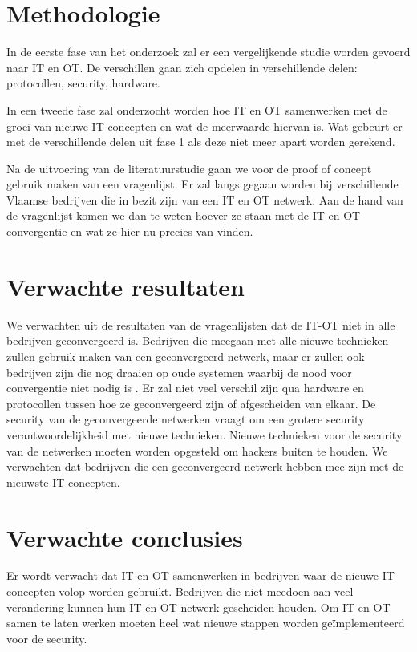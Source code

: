 \section{Methodologie}
\label{sec:methodologie}

In de eerste fase van het onderzoek zal er een vergelijkende studie worden gevoerd naar IT en OT. De verschillen gaan zich opdelen in verschillende delen: protocollen, security, hardware. 


In een tweede fase zal onderzocht worden hoe IT en OT samenwerken met de groei van nieuwe IT concepten en wat de meerwaarde hiervan is. Wat gebeurt er met de verschillende delen uit fase 1 als deze niet meer apart worden gerekend. 


Na de uitvoering van de literatuurstudie gaan we voor de proof of concept gebruik maken van een vragenlijst. Er zal langs gegaan worden bij verschillende Vlaamse bedrijven die in bezit zijn van een IT en OT netwerk. Aan de hand van de vragenlijst komen we dan te weten hoever ze staan met de IT en OT convergentie en wat ze hier nu precies van vinden. 




\section{Verwachte resultaten}
\label{sec:verwachte_resultaten}

We verwachten uit de resultaten van de vragenlijsten dat de IT-OT niet in alle bedrijven geconvergeerd is. Bedrijven die meegaan met alle nieuwe technieken zullen gebruik maken van een geconvergeerd netwerk, maar er zullen ook bedrijven zijn die nog draaien op oude systemen waarbij de nood voor convergentie niet nodig is \autocite{Berge2018}. Er zal niet veel verschil zijn qua hardware en protocollen tussen hoe ze geconvergeerd zijn of afgescheiden van elkaar. De security van de geconvergeerde netwerken vraagt om een grotere security verantwoordelijkheid met nieuwe technieken. Nieuwe technieken voor de security van de netwerken moeten worden opgesteld om hackers buiten te houden. We verwachten dat bedrijven die een geconvergeerd netwerk hebben mee zijn met de nieuwste IT-concepten. 


\section{Verwachte conclusies}
\label{sec:verwachte_conclusies}

Er wordt verwacht dat IT en OT samenwerken in bedrijven waar de nieuwe IT-concepten volop worden gebruikt. Bedrijven die niet meedoen aan veel verandering kunnen hun IT en OT netwerk gescheiden houden. Om IT en OT samen te laten werken moeten heel wat nieuwe stappen worden geïmplementeerd voor de security.

